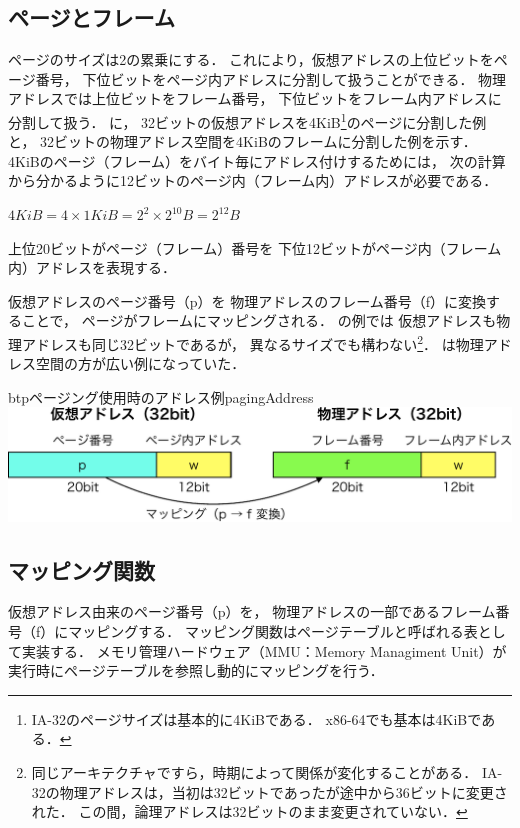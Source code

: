 \subsection{ページとフレーム}
ページのサイズは2の累乗にする．
これにより，仮想アドレスの上位ビットをページ番号，
下位ビットをページ内アドレスに分割して扱うことができる．
物理アドレスでは上位ビットをフレーム番号，
下位ビットをフレーム内アドレスに分割して扱う．
に，
32ビットの仮想アドレスを4KiB\footnote{
  IA-32のページサイズは基本的に4KiBである．
  x86-64でも基本は4KiBである．}のページに分割した例と，
32ビットの物理アドレス空間を4KiBのフレームに分割した例を示す．
4KiBのページ（フレーム）をバイト毎にアドレス付けするためには，
次の計算から分かるように12ビットのページ内（フレーム内）アドレスが必要である．
\centerline{$4KiB = 4 \times 1KiB = 2^2 \times 2^{10}B = 2^{12}B$}
上位20ビットがページ（フレーム）番号を
下位12ビットがページ内（フレーム内）アドレスを表現する．

仮想アドレスのページ番号（p）を
物理アドレスのフレーム番号（f）に変換することで，
ページがフレームにマッピングされる．
の例では
仮想アドレスも物理アドレスも同じ32ビットであるが，
異なるサイズでも構わない\footnote{
  同じアーキテクチャですら，時期によって関係が変化することがある．
  IA-32の物理アドレスは，当初は32ビットであったが途中から36ビットに変更された．
  この間，論理アドレスは32ビットのまま変更されていない．}．
は物理アドレス空間の方が広い例になっていた．

\begin{myfig}{btp}{ページング使用時のアドレス例}{pagingAddress}
  \includegraphics[scale=0.66]{Fig/pagingAddress-crop.pdf}
\end{myfig}

\subsection{マッピング関数}
仮想アドレス由来のページ番号（p）を，
物理アドレスの一部であるフレーム番号（f）にマッピングする．
マッピング関数はページテーブルと呼ばれる表として実装する．
メモリ管理ハードウェア（MMU：Memory Managiment Unit）が
実行時にページテーブルを参照し動的にマッピングを行う．

